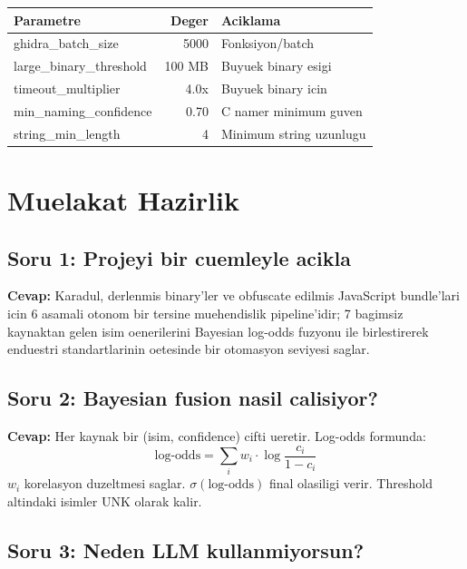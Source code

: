 \documentclass[12pt,a4paper,oneside]{book}
\theoremstyle{definition}
\newcommand{\sigmoid}{\sigma}
\begin{document}
\begin{table}[h]
\centering
\begin{tabular}{lrl}
\toprule
\textbf{\color{sectioncyan}Parametre} & \textbf{\color{sectioncyan}Deger} & \textbf{\color{sectioncyan}Aciklama} \\
\midrule
ghidra\_batch\_size & 5000 & Fonksiyon/batch \\
large\_binary\_threshold & 100 MB & Buyuek binary esigi \\
timeout\_multiplier & 4.0x & Buyuek binary icin \\
min\_naming\_confidence & 0.70 & C namer minimum guven \\
string\_min\_length & 4 & Minimum string uzunlugu \\
\bottomrule
\end{tabular}
\end{table}


\chapter{Muelakat Hazirlik}
\label{app:interview}

\section{Soru 1: Projeyi bir cuemleyle acikla}

\textbf{Cevap:} Karadul, derlenm\-is binary'ler ve obfuscate edilmis JavaScript bundle'lari icin 6 asamali otonom bir tersine muehendislik pipeline'idir; 7 bagimsiz kaynaktan gelen isim oenerilerini Bayesian log-odds fuzyonu ile birlestirerek enduestri standartlarinin oetesinde bir otomasyon sevi\-yesi saglar.

\section{Soru 2: Bayesian fusion nasil calisiyor?}

\textbf{Cevap:} Her kaynak bir (isim, confidence) cifti ueretir. Log-odds formunda:
\[
\text{log-odds} = \sum_i w_i \cdot \log\frac{c_i}{1-c_i}
\]
$w_i$ korelasyon duzeltmesi saglar. $\sigmoid(\text{log-odds})$ final olasiligi verir. Threshold altindaki isimler UNK olarak kalir.

\section{Soru 3: Neden LLM kullanmiyorsun?}
\end{document}
